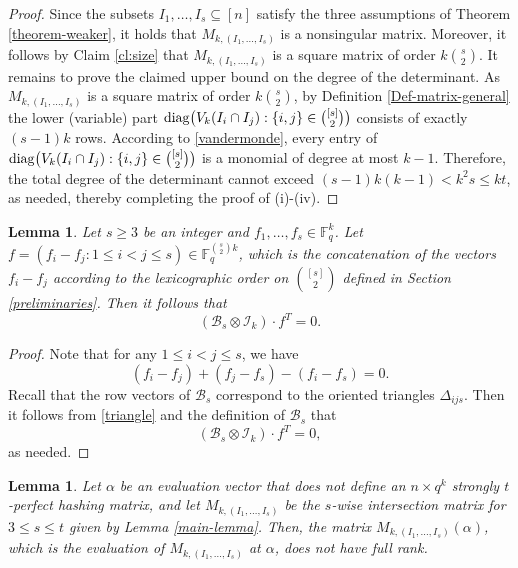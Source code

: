 \documentclass[11pt]{article}
\newtheorem{lemma}[theorem]{Lemma}
\newcommand\black[1]{{\color{black} #1}}
\begin{document}
\begin{proof}
Since the subsets $I_1,\ldots,I_{s}\subseteq [n]$ satisfy the  three assumptions of Theorem \ref{theorem-weaker}, it holds that  $M_{k,(I_1,\ldots,I_{s})}$ is a nonsingular matrix. \black{Moreover, it follows by Claim \ref{cl:size} that $M_{k,(I_1,\ldots,I_{s})}$ is a square matrix of order $k\binom{s}{2}$. It remains to prove the claimed upper bound on the degree of the determinant. As $M_{k,(I_1,\ldots,I_{s})}$ is a square matrix of order $k\binom{s}{2}$, by Definition \ref{Def-matrix-general} the lower (variable) part ${\rm diag}\big(V_k(I_i\cap I_j): \{i,j\}\in \binom{[s]}{2}\big)$ consists of exactly $(s-1)k$ rows. According to \eqref{vandermonde}, every entry of ${\rm diag}\big(V_k(I_i\cap I_j): \{i,j\}\in \binom{[s]}{2}\big)$ is a monomial of degree at most $k-1$. Therefore, the total degree of the determinant cannot exceed $(s-1)k(k-1)<k^2s\le kt$, as needed,}
thereby completing the proof of {\rm (i)}-{\rm (iv)}.
\end{proof}

\begin{lemma}\label{lem:required}
    Let $s\ge 3$ be an integer and $f_1,\ldots,f_s\in\mathbb{F}_q^k$. Let  $f=(f_i-f_j: 1\leq i<j\leq s)\in\mathbb{F}_q^{\binom{s}{2}k}$, which is the concatenation of the vectors  $f_i-f_j$  according to the lexicographic order on $\binom{[s]}{2}$ defined in Section \ref{preliminaries}. Then it follows that \begin{equation*}
 (\mathcal{B}_s\otimes \mathcal{I}_k)\cdot f^T=0.
\end{equation*}
\end{lemma}

\begin{proof}
    Note that for any $1\le i<j\le s$, we have
\begin{equation}\label{triangle}
(f_i-f_j)+(f_j-f_s)-(f_i-f_s)=0.
\end{equation}
Recall that the row vectors of $\mathcal{B}_{s}$ correspond to the oriented triangles $\Delta_{ijs}$. Then it follows from \eqref{triangle} and the definition of $\mathcal{B}_{s}$ that
\begin{equation*}%
 (\mathcal{B}_s\otimes \mathcal{I}_k)\cdot f^T=0,
\end{equation*}
as needed.
\end{proof}

\begin{lemma}\label{main-lemma-2}
  Let $\alpha$ be an evaluation vector that
  does not define an $n\times q^k$ strongly $t$-perfect hashing matrix, and let
  $M_{k,(I_1,\ldots,I_{s})}$  be the $s$-wise intersection matrix for $3\leq s\leq t$ given by Lemma \ref{main-lemma}. Then,  the matrix $M_{k,(I_1,\ldots,I_{s})}(\alpha)$, which is the evaluation of  $M_{k,(I_1,\ldots,I_{s})}$ at $\alpha$,  does not have full rank.
\end{lemma}
\end{document}
